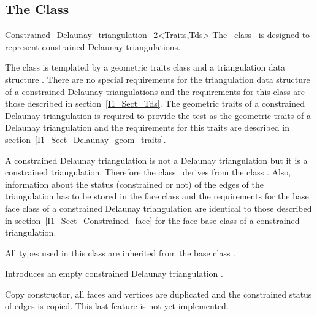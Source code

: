 \subsection{The Class 
\protect {}}
\begin{ccClassTemplate}{Constrained_Delaunay_triangulation_2<Traits,Tds>}
The \cgal\ class \ccClassTemplateName\ is designed to represent
constrained Delaunay triangulations.

The class is templated by a geometric traits class 
and a triangulation data structure .
There are no special requirements for the triangulation data
structure
of a constrained Delaunay triangulations and the requirements
for this class are those described
in section~\ref{I1_Sect_Tds}. The geometric traits 
of a constrained Delaunay triangulation is required
to provide the  test as the geometric traits
of a Delaunay triangulation and the requirements for this traits
are described in section~\ref{I1_Sect_Delaunay_geom_traits}. 

A constrained Delaunay triangulation is not a Delaunay
triangulation but it is a constrained triangulation.
Therefore the class \ccClassTemplateName\ derives from
the class .
Also, information about the status (constrained or not)
of the edges of the triangulation has to be stored
in the face class
 and the requirements for the base face class
of a constrained Delaunay triangulation are 
identical to those described in 
section~\ref{I1_Sect_Constrained_face} for the face base class
of a constrained  triangulation.

 
\ccInheritsFrom {}

\ccTypes
All types used in this class are inherited from the base class
.

\ccCreation
{}

{Introduces an empty constrained Delaunay triangulation \ccVar.}

 {Copy constructor, all faces and vertices
are duplicated and  the constrained status of edges
is copied. This last feature is not yet implemented.}


\end{ccClassTemplate}
